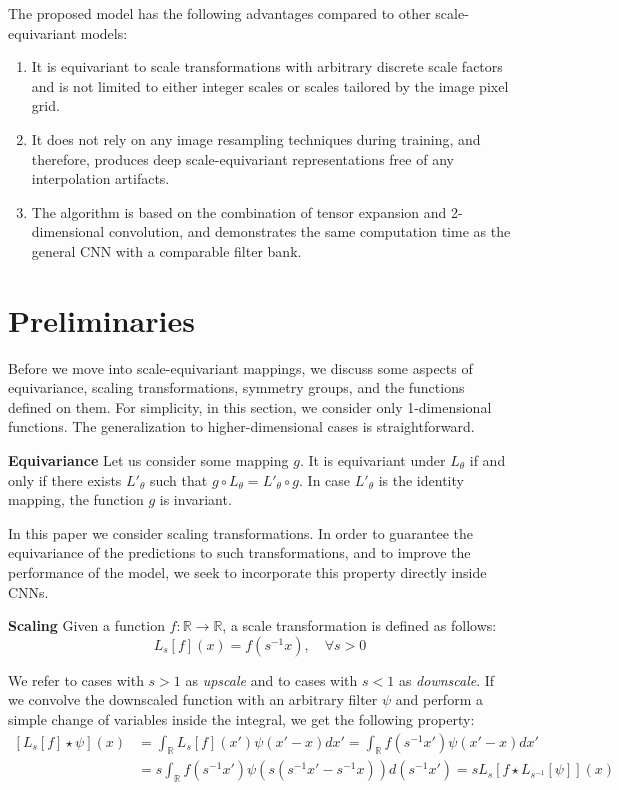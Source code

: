 \documentclass{article} \usepackage{multirow}
\begin{document}
\vspace{5mm}
The proposed model has the following 
advantages compared to other scale-equivariant models:
\begin{enumerate}
    \item It is equivariant to scale transformations with arbitrary discrete scale factors 
        and is not limited to either integer scales or 
        scales tailored by the image pixel grid.
    \item It does not rely on any image resampling techniques during training, and therefore, 
        produces deep scale-equivariant representations free of any interpolation artifacts.
    \item The algorithm is based on the combination of 
        tensor expansion and 2-dimensional convolution, and demonstrates the same 
        computation time as the general CNN with a  comparable filter bank.
\end{enumerate} \section{Preliminaries}
\label{sec:prelim}
Before we move into scale-equivariant mappings, we discuss some aspects of equivariance, 
scaling transformations, symmetry groups, and the functions defined on them.
For simplicity, in this section, we consider only 1-dimensional functions. 
The generalization to higher-dimensional cases is straightforward. 


\textbf{Equivariance}
Let us consider some mapping $g$. It is
equivariant under $L_\theta$ if and only if 
there exists $L'_\theta$ such that 
$g \circ L_\theta = L'_\theta \circ g$. In case 
$L'_\theta$ is the identity mapping, the function $g$ is invariant. 

In this paper we consider scaling transformations. In order to guarantee the equivariance 
of the predictions to such transformations, and to improve the performance of the model, we seek to incorporate this property directly inside CNNs.

\textbf{Scaling}
Given a function $f: \mathbb{R}\rightarrow\mathbb{R}$, a scale transformation is defined as follows:
\begin{equation}
    \label{eq:scale_transformation}
    L_s[f](x) = f(s^{-1}x), \quad \forall s > 0
\end{equation}

We refer to cases with $s>1$ as \textit{upscale} and to cases with $s<1$ as \textit{downscale}. 
If we convolve the downscaled function with an arbitrary filter $\psi$ and 
perform a simple change of variables inside the integral, we get the following property:
\begin{equation}
    \label{eq:scale_prop1}
    \begin{split}
        [L_s[f] \star \psi](x) 
        &= \int_{\mathbb{R}} L_s[f](x') \psi(x'-x) dx' = \int_{\mathbb{R}} f(s^{-1}x') \psi(x'-x) dx'\\
        &= s \int_{\mathbb{R}} f(s^{-1}x') \psi(s(s^{-1}x'-s^{-1}x)) d(s^{-1}x') 
        = s L_s[ f \star L_{s^{-1}}[\psi]](x)
    \end{split}
\end{equation}
\end{document}
